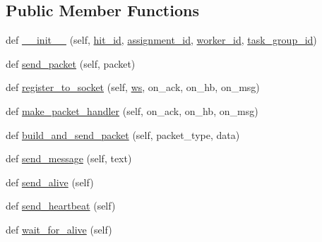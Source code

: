 \subsection*{Public Member Functions}
\begin{DoxyCompactItemize}
\item 
def \hyperlink{classparlai_1_1mturk_1_1core_1_1test_1_1test__socket__manager_1_1MockAgent_a9709b22bd2fbafc96e35b6c4dad827f8}{\+\_\+\+\_\+init\+\_\+\+\_\+} (self, \hyperlink{classparlai_1_1mturk_1_1core_1_1test_1_1test__socket__manager_1_1MockAgent_a04e90964aa86459ae9d3e4ccdf0b240c}{hit\+\_\+id}, \hyperlink{classparlai_1_1mturk_1_1core_1_1test_1_1test__socket__manager_1_1MockAgent_aa00ea5448036f842c103336840c43d4e}{assignment\+\_\+id}, \hyperlink{classparlai_1_1mturk_1_1core_1_1test_1_1test__socket__manager_1_1MockAgent_acf7e9618d669b5562edad479d7e5813e}{worker\+\_\+id}, \hyperlink{classparlai_1_1mturk_1_1core_1_1test_1_1test__socket__manager_1_1MockAgent_a3ef1a1c5d135d3a9de26ce0f95262583}{task\+\_\+group\+\_\+id})
\item 
def \hyperlink{classparlai_1_1mturk_1_1core_1_1test_1_1test__socket__manager_1_1MockAgent_a8093cf5f5ce398010769e21ab23e2859}{send\+\_\+packet} (self, packet)
\item 
def \hyperlink{classparlai_1_1mturk_1_1core_1_1test_1_1test__socket__manager_1_1MockAgent_acb9b096d3f537b0b28b535b387a86967}{register\+\_\+to\+\_\+socket} (self, \hyperlink{classparlai_1_1mturk_1_1core_1_1test_1_1test__socket__manager_1_1MockAgent_a7040472ab9040d5ea6c74defc5816fcd}{ws}, on\+\_\+ack, on\+\_\+hb, on\+\_\+msg)
\item 
def \hyperlink{classparlai_1_1mturk_1_1core_1_1test_1_1test__socket__manager_1_1MockAgent_a06d5e6cb09b2472a0b1972a7bb82ef31}{make\+\_\+packet\+\_\+handler} (self, on\+\_\+ack, on\+\_\+hb, on\+\_\+msg)
\item 
def \hyperlink{classparlai_1_1mturk_1_1core_1_1test_1_1test__socket__manager_1_1MockAgent_a0ed4ae8ea1b3bc86f3397bd4dadf2d40}{build\+\_\+and\+\_\+send\+\_\+packet} (self, packet\+\_\+type, data)
\item 
def \hyperlink{classparlai_1_1mturk_1_1core_1_1test_1_1test__socket__manager_1_1MockAgent_afc1922a7c72563531ab91a1244776f2d}{send\+\_\+message} (self, text)
\item 
def \hyperlink{classparlai_1_1mturk_1_1core_1_1test_1_1test__socket__manager_1_1MockAgent_adb451acb10da3f0da1537de776ae767a}{send\+\_\+alive} (self)
\item 
def \hyperlink{classparlai_1_1mturk_1_1core_1_1test_1_1test__socket__manager_1_1MockAgent_ad0ffb0ccd7e4ea967910e322aa698537}{send\+\_\+heartbeat} (self)
\item 
def \hyperlink{classparlai_1_1mturk_1_1core_1_1test_1_1test__socket__manager_1_1MockAgent_afb67694efb9a09d70b0d73eceae3a702}{wait\+\_\+for\+\_\+alive} (self)
\end{DoxyCompactItemize}
